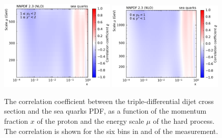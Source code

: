 \begin{figure}[htbp]
    \includegraphics[width=0.49\textwidth]{figures/pdf_constraints/corr_PTMAXEXPYS_YBYS_NLO_FINALBINS_NNPDF23_sea_quarks_ys1_0yb1_0_cl.pdf}\hfill
    \includegraphics[width=0.49\textwidth]{figures/pdf_constraints/corr_PTMAXEXPYS_YBYS_NLO_FINALBINS_NNPDF23_sea_quarks_ys0_0yb0_0_cl.pdf}\hfill
    \caption[Correlation between dijet cross section and sea quarks PDF]{
            The correlation coefficient between the triple-differential dijet cross
            section and the sea quarks PDF, as a function of the momentum fraction $x$ of the
            proton and the energy scale $\mu$ of the hard process. The correlation is shown
            for the six bins in \ystar and \yboost of the measurement.}
    \label{fig:pdfconstraints_sea_quarks}
\end{figure}

